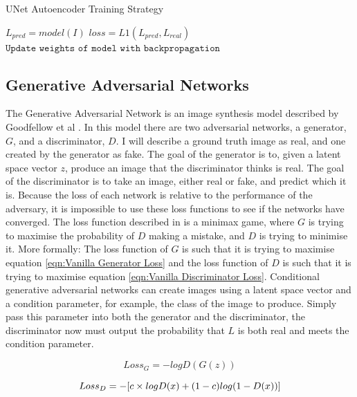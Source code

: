 \documentclass{UoYCSproject}
\begin{document}
\begin{algorithm}
\caption{UNet Autoencoder Training Strategy}\label{ALG:Autoencoder}
\begin{algorithmic}[1]
\State
\State $L_{pred} = model(I)$
\State $loss = L1( L_{pred}, L_{real} ) $
\State $\texttt{Update weights of model with backpropagation}$
\State
\EndFor
\EndFor
\end{algorithmic}
\end{algorithm}

\subsection{Generative Adversarial Networks} \label{GAN_METHODS}

The Generative Adversarial Network is an image synthesis model described by Goodfellow et al \cite{goodfellow2014generative}. In this model there are two adversarial networks, a generator, $ G $, and a discriminator, $ D $. I will describe a ground truth image as real, and one created by the generator as fake. The goal of the generator is to, given a latent space vector $ z $, produce an image that the discriminator thinks is real. The goal of the discriminator is to take an image, either real or fake, and predict which it is. Because the loss of each network is relative to the performance of the adversary, it is impossible to use these loss functions to see if the networks have converged. The loss function described in \cite{goodfellow2014generative} is a minimax game, where $ G $ is trying to maximise the probability of $ D $ making a mistake, and $ D $ is trying to minimise it. More formally: The loss function of $ G $ is such that it is trying to maximise equation \ref{eqn:Vanilla Generator Loss} and the loss function of $ D $ is such that it is trying to maximise equation \ref{eqn:Vanilla Discriminator Loss}. Conditional generative adversarial networks can create images using a latent space vector and a condition parameter, for example, the class of the image to produce. Simply pass this parameter into both the generator and the discriminator, the discriminator now must output the probability that $ L $ is both real and meets the condition parameter.

\begin{equation}
    \label{eqn:Vanilla Generator Loss}
    Loss_G = -logD (G(z)) 
\end{equation}

\begin{equation}
    \label{eqn:Vanilla Discriminator Loss}
    Loss_D = -[c \times logD(x) + (1-c) log (1 - D(x))] \\
\end{equation}
\end{document}
